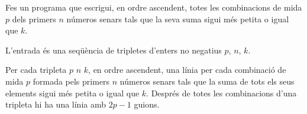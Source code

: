 

\Statement

Fes un programa que escrigui, en ordre ascendent, totes les combinacions de mida $p$ dels primers $n$ números senars tals que la seva suma sigui més petita o igual que $k$.


\Input

L'entrada és una seqüència de tripletes d'enters no negatius $p$, $n$, $k$.

\Output

Per cada tripleta $p$ $n$ $k$, en ordre ascendent, una línia per cada combinació de mida $p$ formada pels primers $n$ números senars tals que la suma de tots els seus elements sigui més petita o igual que $k$. Després de totes les combinacions d'una tripleta hi ha una línia amb $2p - 1$ guions.


\Sample
